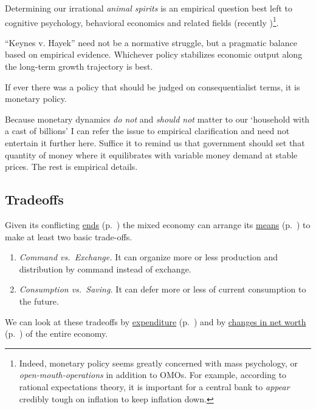 \begin{enumerate}
	Determining our irrational \emph{animal spirits} \citep{Keynes1936} is an empirical question best left to cognitive psychology, behavioral economics and related fields (recently \citealt{Akerlof2010})\footnote{
		Indeed, monetary policy seems greatly concerned with mass psychology, or \emph{open-mouth-operations} in addition to \gls{OMO}s. For example, according to rational expectations theory, it is important for a central bank to \emph{appear} credibly tough on inflation to keep inflation down.}.

	``Keynes v. Hayek'' \citep{Wapshott2011} need not be a normative struggle, but a pragmatic balance based on empirical evidence. Whichever policy stabilizes economic output along the long-term growth trajectory is best.

	If ever there was a policy that should be judged on consequentialist terms, it is monetary policy.
\end{enumerate}

Because monetary dynamics \emph{do not} and \emph{should not} matter to our `household with a cast of billions' I can refer the issue to empirical clarification and need not entertain it further here. Suffice it to remind us that government should set that quantity of money where it equilibrates with variable money demand at stable prices. The rest is empirical details.

\subsection[Tradeoffs]{Tradeoffs} \label{sec:tradeoffs} Given its conflicting \hyperref[sec:ends]{ends} (p.~\pageref{sec:ends}) the mixed economy can arrange its \hyperref[sec:means]{means} (p.~\pageref{sec:means}) to make at least two basic trade-offs.
\begin{enumerate}
	\item \emph{Command vs.\ Exchange.} It can organize more or less production and distribution by command instead of exchange.
	\item \emph{Consumption vs.\ Saving.} It can defer more or less of current consumption to the future.
\end{enumerate}

We can look at these tradeoffs by \hyperref[sec:byexpenditure]{expenditure} (p.~\pageref{sec:byexpenditure}) and by \hyperref[sec:deltanetworth]{changes in net worth} (p.~\pageref{sec:deltanetworth}) of the entire economy.

